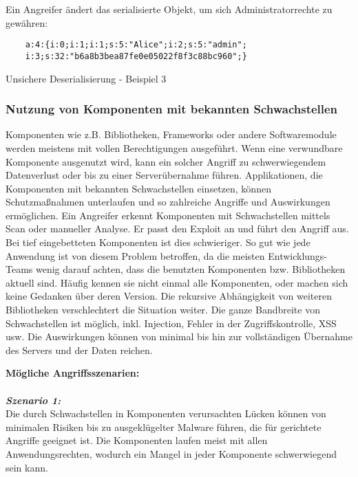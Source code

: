 Ein Angreifer ändert das serialisierte Objekt, um sich Administratorrechte zu gewähren:

\begin{Listing}[h]
	\begin{lstlisting}
	a:4:{i:0;i:1;i:1;s:5:"Alice";i:2;s:5:"admin";
	i:3;s:32:"b6a8b3bea87fe0e05022f8f3c88bc960";}
	\end{lstlisting}
	\caption{Unsichere Deserialisierung - Beispiel 3}
	\label{lst:ud3}
\end{Listing}

\subsubsection{Nutzung von Komponenten mit bekannten Schwachstellen}

Komponenten wie z.B. Bibliotheken, Frameworks oder andere Softwaremodule werden meistens mit vollen Berechtigungen ausgeführt. Wenn eine verwundbare Komponente ausgenutzt wird, kann ein solcher Angriff zu schwerwiegendem Datenverlust oder bis zu einer Serverübernahme führen. Applikationen, die Komponenten mit bekannten Schwachstellen einsetzen, können Schutzmaßnahmen unterlaufen und so zahlreiche Angriffe und Auswirkungen ermöglichen\cite[6]{owasp17top10}. Ein Angreifer erkennt Komponenten mit Schwachstellen mittels Scan oder manueller Analyse. Er passt den Exploit an und führt den Angriff aus. Bei tief eingebetteten Komponenten ist dies schwieriger. So gut wie jede Anwendung ist von diesem Problem betroffen, da die meisten Entwicklungs-Teams wenig darauf achten, dass die benutzten Komponenten bzw. Bibliotheken aktuell sind. Häufig kennen sie nicht einmal alle Komponenten, oder machen sich keine Gedanken über deren Version. Die rekursive Abhängigkeit von weiteren Bibliotheken verschlechtert die Situation weiter. Die ganze Bandbreite von Schwachstellen ist möglich, inkl. Injection, Fehler in der Zugriffskontrolle, XSS usw. Die Auswirkungen können von minimal bis hin zur vollständigen Übernahme
des Servers und der Daten reichen\cite[15]{owasp17top10}.

\textbf{Mögliche Angriffsszenarien:}\\
\\
\textbf{\textit{Szenario 1:}}\\
Die durch Schwachstellen in Komponenten verursachten
Lücken können von minimalen Risiken bis zu ausgeklügelter Malware führen, die für gerichtete Angriffe geeignet ist. Die Komponenten laufen meist mit allen Anwendungsrechten, wodurch ein Mangel in jeder Komponente schwerwiegend sein kann\cite[15]{owasp17top10}.

